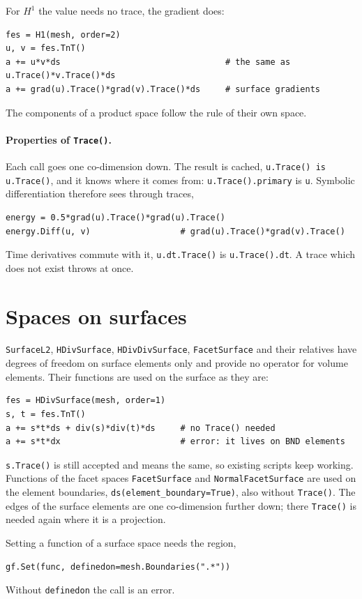 \documentclass[10pt,a4paper]{article}
\newcommand{\code}[1]{\texttt{#1}}
\begin{document}
For $H^1$ the value needs no trace, the gradient does:
\begin{lstlisting}
fes = H1(mesh, order=2)
u, v = fes.TnT()
a += u*v*ds                                 # the same as u.Trace()*v.Trace()*ds
a += grad(u).Trace()*grad(v).Trace()*ds     # surface gradients
\end{lstlisting}
The components of a product space follow the rule of their own space.

\paragraph{Properties of \code{Trace()}.} Each call goes one co-dimension down. The result is cached, \code{u.Trace() is u.Trace()}, and it knows where it comes from: \code{u.Trace().primary} is \code{u}. Symbolic differentiation therefore sees through traces,
\begin{lstlisting}[numbers=none,xleftmargin=0pt]
energy = 0.5*grad(u).Trace()*grad(u).Trace()
energy.Diff(u, v)                  # grad(u).Trace()*grad(v).Trace()
\end{lstlisting}
Time derivatives commute with it, \code{u.dt.Trace()} is \code{u.Trace().dt}. A trace which does not exist throws at once.

\section{Spaces on surfaces}

\code{SurfaceL2}, \code{HDivSurface}, \code{HDivDivSurface}, \code{FacetSurface} and their relatives have degrees of freedom on surface elements only and provide no operator for volume elements. Their functions are used on the surface as they are:
\begin{lstlisting}
fes = HDivSurface(mesh, order=1)
s, t = fes.TnT()
a += s*t*ds + div(s)*div(t)*ds     # no Trace() needed
a += s*t*dx                        # error: it lives on BND elements
\end{lstlisting}
\code{s.Trace()} is still accepted and means the same, so existing scripts keep working. Functions of the facet spaces \code{FacetSurface} and \code{NormalFacetSurface} are used on the element boundaries, \code{ds(element\_boundary=True)}, also without \code{Trace()}. The edges of the surface elements are one co-dimension further down; there \code{Trace()} is needed again where it is a projection.

Setting a function of a surface space needs the region,
\begin{lstlisting}[numbers=none,xleftmargin=0pt]
gf.Set(func, definedon=mesh.Boundaries(".*"))
\end{lstlisting}
Without \code{definedon} the call is an error.
\end{document}
